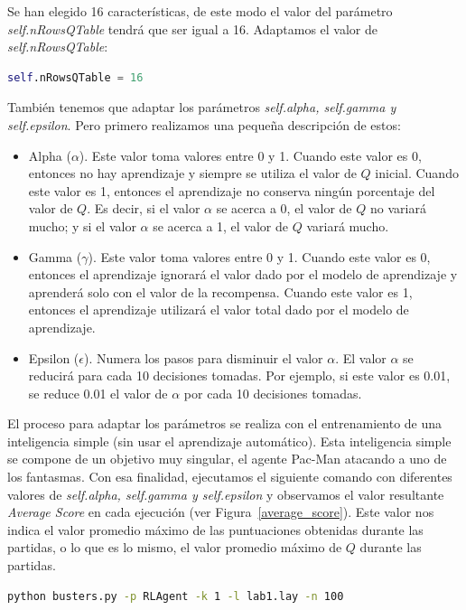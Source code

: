 \documentclass[11pt]{exam}
\begin{document}
Se han elegido 16 características, de este modo el valor del parámetro \textit{self.nRowsQTable} tendrá que ser igual a 16. Adaptamos el valor de \textit{self.nRowsQTable}:

\begin{lstlisting}[language=python, basicstyle=\footnotesize]
self.nRowsQTable = 16
\end{lstlisting}

También tenemos que adaptar los parámetros \textit{self.alpha, self.gamma y self.epsilon}. Pero primero realizamos una pequeña descripción de estos:

\begin{itemize}
	\item Alpha ($\alpha$). Este valor toma valores entre 0 y 1. Cuando este valor es 0, entonces no hay aprendizaje y siempre se utiliza el valor de $Q$ inicial. Cuando este valor es 1, entonces el aprendizaje no conserva ningún porcentaje del valor de $Q$. Es decir, si el valor $\alpha$ se acerca a 0, el valor de $Q$ no variará mucho; y si el valor $\alpha$ se acerca a 1, el valor de $Q$ variará mucho.
	\item Gamma ($\gamma$). Este valor toma valores entre 0 y 1. Cuando este valor es 0, entonces el aprendizaje ignorará el valor dado por el modelo de aprendizaje y aprenderá solo con el valor de la recompensa. Cuando este valor es 1, entonces el aprendizaje utilizará el valor total dado por el modelo de aprendizaje.
	\item Epsilon ($\epsilon$). Numera los pasos para disminuir el valor $\alpha$. El valor $\alpha$ se reducirá para cada 10 decisiones tomadas. Por ejemplo, si este valor es 0.01, se reduce 0.01 el valor de $\alpha$ por cada 10 decisiones tomadas.
\end{itemize}

El proceso para adaptar los parámetros se realiza con el entrenamiento de una inteligencia simple (sin usar el aprendizaje automático). Esta inteligencia simple se compone de un objetivo muy singular, el agente Pac-Man atacando a uno de los fantasmas. Con esa finalidad, ejecutamos el siguiente comando con diferentes valores de \textit{self.alpha, self.gamma y self.epsilon} y observamos el valor resultante \textit{Average Score} en cada ejecución (ver Figura~\ref{average_score}). Este valor nos indica el valor promedio máximo de las puntuaciones obtenidas durante las partidas, o lo que es lo mismo, el valor promedio máximo de $Q$ durante las partidas.

\begin{lstlisting}[language=bash, basicstyle=\footnotesize]
python busters.py -p RLAgent -k 1 -l lab1.lay -n 100
\end{lstlisting}
\end{document}
